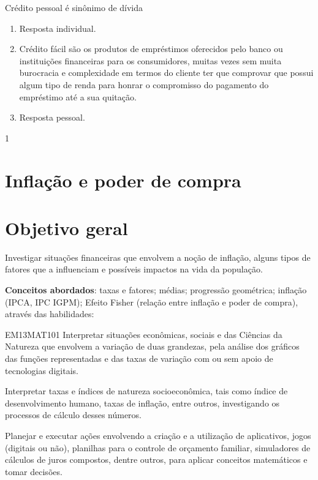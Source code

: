\begin{resposta}{Crédito pessoal é sinônimo de dívida}
{
  \begin{enumerate}
    \item Resposta individual.
    \item Crédito fácil são os produtos de empréstimos oferecidos pelo banco ou instituições financeiras para os consumidores, muitas vezes sem muita burocracia e complexidade em termos do cliente ter que comprovar que possui algum tipo de renda para honrar o compromisso do pagamento do empréstimo até a sua quitação.
    \item Resposta pessoal.
  \end{enumerate}
}{1}
\end{resposta}

\begin{paginatexto2}
\section*{Inflação e poder de compra}
\section*{Objetivo geral}
Investigar situações financeiras que envolvem a noção de inflação, alguns tipos de fatores que a influenciam e possíveis impactos na vida da população.

\textbf{Conceitos abordados}: taxas e fatores; médias; progressão geométrica; inflação (IPCA, IPC IGPM); Efeito Fisher (relação entre inflação e poder de compra), através das habilidades:

\begin{objetivos}{EM13MAT101}
 Interpretar situações econômicas, sociais e das Ciências da Natureza
que envolvem a variação de duas grandezas, pela análise dos gráficos das funções representadas e das taxas de variação com ou sem apoio de tecnologias digitais.


Interpretar taxas e índices de natureza socioeconômica, tais como índice de desenvolvimento humano, taxas de inflação, entre outros, investigando os processos de cálculo desses números.

Planejar e executar ações envolvendo a criação e a utilização de aplicativos, jogos (digitais ou não), planilhas para o controle de orçamento familiar, simuladores de cálculos de juros compostos, dentre outros, para aplicar conceitos matemáticos e tomar decisões. 


\end{objetivos}
\end{paginatexto2}
